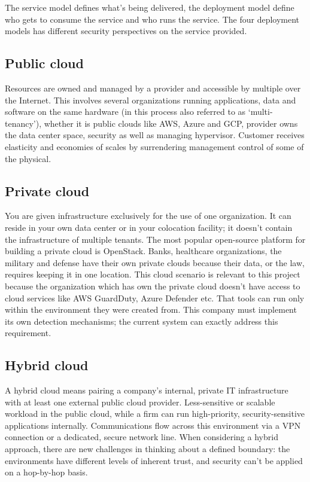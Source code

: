 The service model defines what's being delivered, the deployment model define who gets to consume the service and who runs the service. The four deployment models has different security perspectives on the service provided.

\subsection{Public cloud}

Resources are owned and managed by a provider and accessible by multiple over the Internet. This involves several organizations running applications, data and software on the same hardware (in this process also referred to as ‘multi- tenancy’), whether it is public clouds like AWS, Azure and GCP, provider owns the data center space, security as well as managing hypervisor. Customer receives elasticity and economies of scales by surrendering management control of some of the physical.

\subsection{Private cloud}

You are given infrastructure exclusively for the use of one organization. It can reside in your own data center or in your colocation facility; it doesn’t contain the infrastructure of multiple tenants. The most popular open-source platform for building a private cloud is OpenStack. 
Banks, healthcare organizations, the military and defense have their own private clouds because their data, or the law, requires keeping it in one location. 
This cloud scenario is relevant to this project because the organization which has own the private cloud doesn’t have access to cloud services like AWS GuardDuty, Azure Defender etc. That tools can run only within the environment they were created from. This company must implement its own detection mechanisms; the current system can exactly address this requirement.

\subsection{Hybrid cloud}

A hybrid cloud means pairing a company’s internal, private IT infrastructure with at least one external public cloud provider. Less-sensitive or scalable workload in the public cloud, while a firm can run high-priority, security-sensitive applications internally. Communications flow across this environment via a VPN connection or a dedicated, secure network line. When considering a hybrid approach, there are new challenges in thinking about a defined boundary: the environments have different levels of inherent trust, and security can’t be applied on a hop-by-hop basis.

